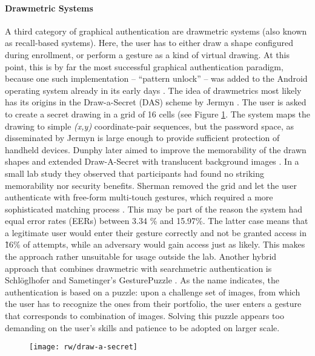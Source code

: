 	\paragraph{Drawmetric Systems}
	A third category of graphical authentication are drawmetric systems (also known as recall-based systems). Here, the user has to either draw a shape configured during enrollment, or perform a gesture as a kind of virtual drawing. At this point, this is by far the most successful graphical authentication paradigm, because one such implementation -- ``pattern unlock'' -- was added to the Android operating system already in its early days \cite{Aviv2010SmudgeAttacks}. The idea of drawmetrics most likely has its origins in the Draw-a-Secret (DAS) scheme by Jermyn \etal \cite{Jermyn1999DrawASecret}. The user is asked to create a secret drawing in a grid of 16 cells (see Figure \ref{fig:rw:drawmetric}. The system maps the drawing to simple \textit{(x,y)} coordinate-pair sequences, but the password space, as disseminated by Jermyn \etal is large enough to provide sufficient protection of handheld devices. Dunphy \etal later aimed to improve the memorability of the drawn shapes and extended Draw-A-Secret with translucent background images \cite{Dunphy2007BDAS}. In a small lab study they observed that participants had found no striking memorability nor security benefits. Sherman \etal removed the grid and let the user authenticate with free-form multi-touch gestures, which required a more sophisticated matching process \cite{Sherman2014UserGeneratedGesturesAuth}. This may be part of the reason the system had equal error rates (EERs) between 3.34 \% and 15.97\%. The latter case means that a legitimate user would enter their gesture correctly and not be granted access in \~16\% of attempts, while an adversary would gain access just as likely. This makes the approach rather unsuitable for usage outside the lab. Another hybrid approach that combines drawmetric with searchmetric authentication is Schlöglhofer and Sametinger's GesturePuzzle \cite{Schloglhofer2012SecureAndUsableMobileAuth}. As the name indicates, the authentication is based on a puzzle: upon a challenge set of images, from which the user has to recognize the ones from their portfolio, the user enters a gesture that corresponds to combination of images. Solving this puzzle appears too demanding on the user's skills and patience to be adopted on larger scale. 
	
	\begin{figure}[htbp]
		\centering
		\texttt{[image: rw/draw-a-secret]}
		\caption{\label{fig:rw:drawmetric}}
	\end{figure}
	
